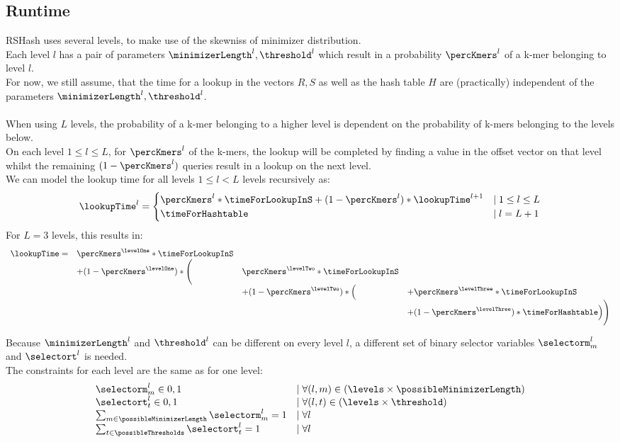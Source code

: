 \subsection*{Runtime}
RSHash uses several levels, to make use of the skewniss of minimizer distribution.\\
Each level $l$ has a pair of parameters $\minimizerLength^l, \threshold^l$ which result in a probability $\percKmers^l$ of a k-mer belonging to level $l$.\\
For now, we still assume, that the time for a lookup in the vectors $R,S$ as well as the hash table $H$ are (practically) independent of the parameters $\minimizerLength^l, \threshold^l$. \\
\\
When using $L$ levels, the probability of a k-mer belonging to a higher level is dependent on the probability of k-mers belonging to the levels below.\\
On each level $1 \leq l \leq L$, for $\percKmers^l$ of the k-mers, the lookup will be completed by finding a value in the offset vector on that level whilst the remaining $(1-\percKmers^l)$ queries result in a lookup on the next level.\\
We can model the lookup time for all levels $1\leq l<L$ levels recursively as:
\[ 
\lookupTime^l =
\begin{cases}
	\percKmers^l*\timeForLookupInS + (1-\percKmers^l)*\lookupTime^{l+1} &\mid 1\leq l \leq L\\
	\timeForHashtable &\mid l=L+1
\end{cases}
\]
For $L=3$ levels, this results in:
\[
\begin{array}{llll}
	\lookupTime =
	&\percKmers^\levelOne*\timeForLookupInS\\
	&+ (1-\percKmers^\levelOne) * \Bigg(&\percKmers^\levelTwo*\timeForLookupInS\\
			&&+(1-\percKmers^\levelTwo) * \Big( &+ \percKmers^\levelThree*\timeForLookupInS\\
				&&&+ (1-\percKmers^\levelThree) * \timeForHashtable \Big) \Bigg)
\end{array}
\]

Because $\minimizerLength^l$ and $\threshold^l$ can be different on every level $l$, a different set of binary selector variables $\selectorm^l_m$ and $\selectort^l$ is needed.\\
The constraints for each level are the same as for one level:
\[ \begin{array}{ll}
	\selectorm_m^l \in {0,1} & \mid \forall (l,m) \in (\levels \times \possibleMinimizerLength) \\
	\selectort_t^l \in {0,1} & \mid \forall (l,t) \in (\levels \times \threshold) \\
	\sum_{m \in \possibleMinimizerLength} \selectorm_m^l = 1 & \mid \forall l \\
	\sum_{t \in \possibleThresholds} \selectort_t^l = 1 & \mid \forall l
\end{array} \]


